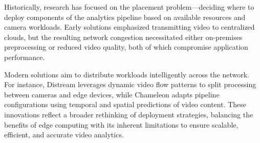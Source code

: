 Historically, research has focused on the placement problem—deciding where to deploy components of the analytics pipeline based on available resources and camera workloads. Early solutions emphasized transmitting video to centralized clouds, but the resulting network congestion necessitated either on-premises preprocessing or reduced video quality, both of which compromise application performance.

Modern solutions aim to distribute workloads intelligently across the network. For instance, Distream leverages dynamic video flow patterns to split processing between cameras and edge devices, while Chameleon adapts pipeline configurations using temporal and spatial predictions of video content. These innovations reflect a broader rethinking of deployment strategies, balancing the benefits of edge computing with its inherent limitations to ensure scalable, efficient, and accurate video analytics.




